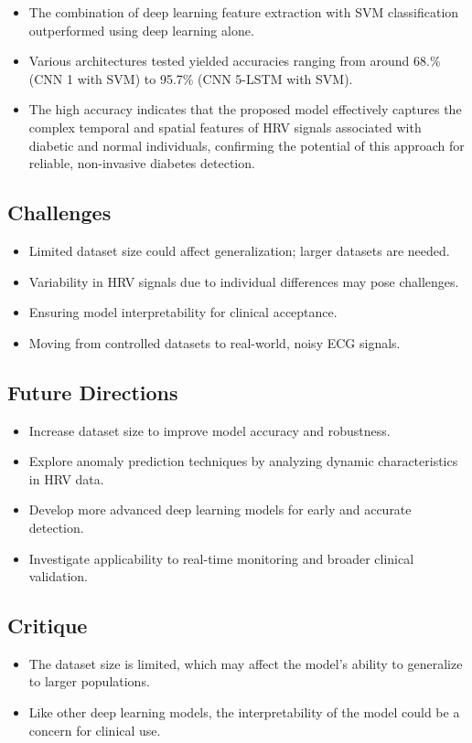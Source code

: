 \begin{itemize}
    \item The combination of deep learning feature extraction with SVM classification outperformed using deep learning alone.
    \item Various architectures tested yielded accuracies ranging from around 68.\% (CNN 1 with SVM) to 95.7\% (CNN 5-LSTM with SVM).
    \item The high accuracy indicates that the proposed model effectively captures the complex temporal and spatial features of HRV signals associated with diabetic and normal individuals, confirming the potential of this approach for reliable, non-invasive diabetes detection.
\end{itemize}
\subsection*{Challenges}
\begin{itemize}
    \item Limited dataset size could affect generalization; larger datasets are needed.
    \item Variability in HRV signals due to individual differences may pose challenges.
    \item Ensuring model interpretability for clinical acceptance.
    \item Moving from controlled datasets to real-world, noisy ECG signals.
\end{itemize}

\subsection*{Future Directions}
\begin{itemize}
    \item Increase dataset size to improve model accuracy and robustness.
    \item Explore anomaly prediction techniques by analyzing dynamic characteristics in HRV data.
    \item Develop more advanced deep learning models for early and accurate detection.
    \item Investigate applicability to real-time monitoring and broader clinical validation.
\end{itemize}
\subsection*{Critique}
\begin{itemize}
    \item The dataset size is limited, which may affect the model's ability to generalize to larger populations.
    \item Like other deep learning models, the interpretability of the model could be a concern for clinical use.
\end{itemize}

